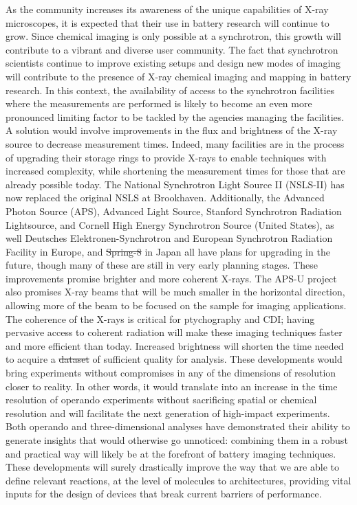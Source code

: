 \documentclass[journal=cmatex,manuscript=perspective]{achemso}
\providecommand{\DIFaddtex}[1]{{\protect\color{blue}\uwave{#1}}} %
\providecommand{\DIFdeltex}[1]{{\protect\color{red}\sout{#1}}}                      %
\providecommand{\DIFaddbegin}{} %
\providecommand{\DIFaddend}{} %
\providecommand{\DIFdelbegin}{} %
\providecommand{\DIFdelend}{} %
\providecommand{\DIFadd}[1]{\texorpdfstring{\DIFaddtex{#1}}{#1}} %
\providecommand{\DIFdel}[1]{\texorpdfstring{\DIFdeltex{#1}}{}} %
\begin{document}
As the community increases its awareness of the unique capabilities of
X-ray microscopes, it is expected that their use in battery research
will continue to grow. Since chemical imaging is only possible at a
synchrotron, this growth will contribute to a vibrant and diverse user
community. The fact that synchrotron scientists continue to improve
existing setups and design new modes of imaging will contribute to the
presence of X-ray chemical imaging and mapping in battery research. In
this context, the availability of access to the synchrotron facilities
where the measurements are performed is likely to become an even more
pronounced limiting factor to be tackled by the agencies managing the
facilities. A solution would involve improvements in the flux and
brightness of the X-ray source to decrease measurement times. Indeed,
many facilities are in the process of upgrading their storage rings to
provide X-rays to enable techniques with increased complexity, while
shortening the measurement times for those that are already possible
today. The National Synchrotron Light Source II (NSLS-II) has now
replaced the original NSLS at Brookhaven. Additionally, the Advanced
Photon Source (APS), Advanced Light Source, Stanford Synchrotron
Radiation Lightsource, and Cornell High Energy Synchrotron Source
(United States), as well \DIFaddbegin \DIFadd{as }\DIFaddend Deutsches Elektronen-Synchrotron and
European Synchrotron Radiation Facility in Europe, and \DIFdelbegin \DIFdel{Spring-8 }\DIFdelend \DIFaddbegin \DIFadd{SPring-8 }\DIFaddend in
Japan all have plans for upgrading in the future, though many of these
are still in very early planning stages. These improvements promise
brighter and more coherent X-rays. The APS-U project also promises
X-ray beams that will be much smaller in the horizontal direction,
allowing more of the beam to be focused on the sample for imaging
applications. The coherence of the X-rays is critical for ptychography
and CDI; having pervasive access to coherent radiation will make these
imaging techniques faster and more efficient than today. Increased
brightness will shorten the time needed to acquire a \DIFdelbegin \DIFdel{dataset }\DIFdelend \DIFaddbegin \DIFadd{data-set }\DIFaddend of
sufficient quality for analysis. These developments would bring
experiments without compromises in any of the dimensions of resolution
closer to reality. In other words, it would translate into an increase
in the time resolution of operando experiments without sacrificing
spatial or chemical resolution and will facilitate the next generation
of high-impact experiments. Both operando and three-dimensional
analyses have demonstrated their ability to generate insights that
would otherwise go unnoticed: combining them in a robust and practical
way will likely be at the forefront of battery imaging
techniques. These developments will surely drastically improve the way
that we are able to define relevant reactions, at the level of
molecules to architectures, providing vital inputs for the design of
devices that break current barriers of performance.
\end{document}
